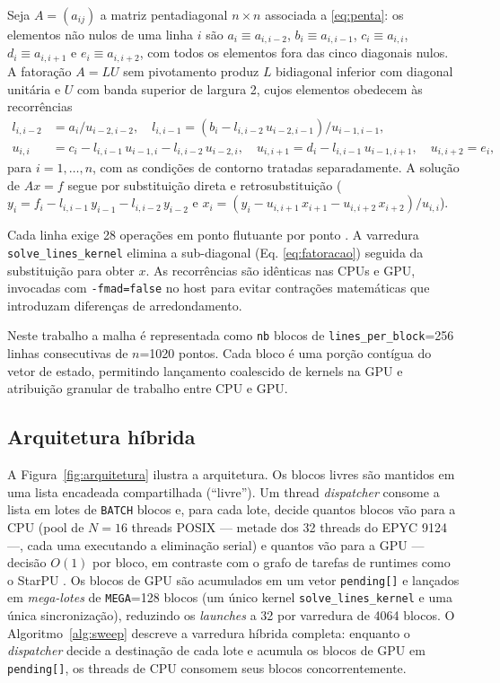 \documentclass[12pt]{article}
\begin{document}
Seja $A = (a_{ij})$ a matriz pentadiagonal $n \times n$ associada a
\eqref{eq:penta}: os elementos não nulos de uma linha $i$ são
$a_i \equiv a_{i,i-2}$, $b_i \equiv a_{i,i-1}$, $c_i \equiv a_{i,i}$,
$d_i \equiv a_{i,i+1}$ e $e_i \equiv a_{i,i+2}$, com todos os elementos
fora das cinco diagonais nulos. A fatoração $A = LU$ sem pivotamento
\cite{golub:2013} produz $L$ bidiagonal inferior com diagonal unitária e $U$ com banda
superior de largura 2, cujos elementos obedecem às recorrências
\begin{equation}
\begin{aligned}
  l_{i,i-2} &= a_i/u_{i-2,i-2}, \quad
  l_{i,i-1} = (b_i - l_{i,i-2}\,u_{i-2,i-1})/u_{i-1,i-1},\\
  u_{i,i}   &= c_i - l_{i,i-1}\,u_{i-1,i} - l_{i,i-2}\,u_{i-2,i}, \quad
  u_{i,i+1} = d_i - l_{i,i-1}\,u_{i-1,i+1}, \quad
  u_{i,i+2} = e_i,
\end{aligned}
\label{eq:fatoracao}
\end{equation}
para $i = 1, \dots, n$, com as condições de contorno tratadas separadamente. A solução de $Ax = f$ segue por substituição direta e retrosubstituição ($y_i = f_i - l_{i,i-1}\,y_{i-1} - l_{i,i-2}\,y_{i-2}$ e $x_i = (y_i - u_{i,i+1}\,x_{i+1} - u_{i,i+2}\,x_{i+2})/u_{i,i}$). 

Cada linha exige 28 operações em ponto flutuante por ponto \cite{golub:2013}. A varredura \texttt{solve\_lines\_kernel} elimina a sub-diagonal (Eq. \ref{eq:fatoracao}) seguida da substituição para obter $x$. As recorrências são idênticas nas CPUs e GPU, invocadas com \texttt{-fmad=false} no host para evitar contrações matemáticas que introduzam diferenças de arredondamento.

Neste trabalho a malha é representada como \texttt{nb} blocos de
\texttt{lines\_per\_block}=256 linhas consecutivas de $n$=1020 pontos. Cada
bloco é uma porção contígua do vetor de estado, permitindo lançamento
coalescido de kernels na GPU e atribuição granular de trabalho entre CPU e
GPU.

\subsection{Arquitetura híbrida}

A Figura~\ref{fig:arquitetura} ilustra a arquitetura. Os blocos livres são
mantidos em uma lista encadeada compartilhada (``livre''). Um thread
\emph{dispatcher} consome a lista em lotes de \texttt{BATCH} blocos e, para
cada lote, decide quantos blocos vão para a CPU (pool de $N=16$ threads
POSIX — metade dos 32 threads do EPYC 9124 —, cada uma executando a eliminação serial) e quantos vão para a GPU — decisão $O(1)$ por bloco, em contraste
com o grafo de tarefas de runtimes como o StarPU \cite{starpu:2011}. Os
blocos de GPU são acumulados em um vetor \texttt{pending[]} e lançados em
\emph{mega-lotes} de \texttt{MEGA}=128 blocos (um único kernel
\texttt{solve\_lines\_kernel} e uma única sincronização), reduzindo os
\emph{launches} a 32 por varredura de 4064 blocos. O
Algoritmo~\ref{alg:sweep} descreve a varredura híbrida completa: enquanto o
\emph{dispatcher} decide a destinação de cada lote e acumula os blocos de
GPU em \texttt{pending[]}, os threads de CPU consomem seus blocos
concorrentemente.
\end{document}
